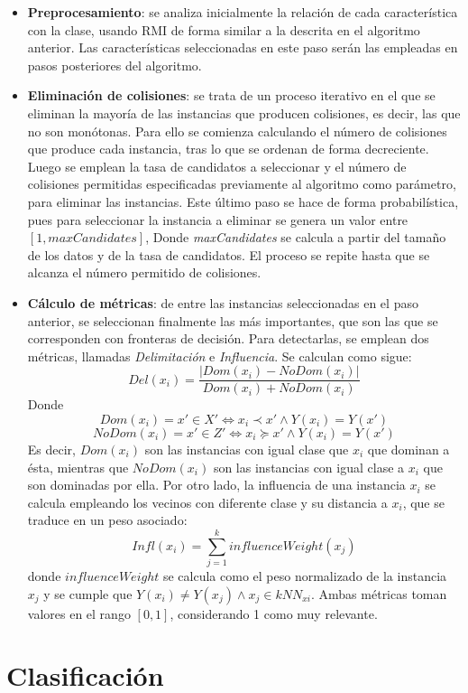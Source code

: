 \begin{itemize}
	\item \textbf{Preprocesamiento}: se analiza inicialmente la relación de cada característica con la clase, usando RMI de forma similar a la descrita en el algoritmo anterior. Las características seleccionadas en este paso serán las empleadas en pasos posteriores del algoritmo.
	\item \textbf{Eliminación de colisiones}: se trata de un proceso iterativo en el que se eliminan la mayoría de las instancias que producen colisiones, es decir, las que no son monótonas. Para ello se comienza calculando el número de colisiones que produce cada instancia, tras lo que se ordenan de forma decreciente. Luego se emplean la tasa de candidatos a seleccionar y el número de colisiones permitidas especificadas previamente al algoritmo como parámetro, para eliminar las instancias. Este último paso se hace de forma probabilística, pues para seleccionar la instancia a eliminar se genera un valor entre $\left[1,maxCandidates \right]$, Donde \textit{maxCandidates} se calcula a partir del tamaño de los datos y de la tasa de candidatos. El proceso se repite hasta que se alcanza el número permitido de colisiones.
	\item \textbf{Cálculo de métricas}: de entre las instancias seleccionadas en el paso anterior, se seleccionan finalmente las más importantes, que son las que se corresponden con fronteras de decisión. Para detectarlas, se emplean dos métricas, llamadas \textit{Delimitación} e \textit{Influencia}. Se calculan como sigue:
	$$Del(x_i)=\frac{|Dom(x_i)-NoDom(x_i)|}{Dom(x_i)+NoDom(x_i)}$$
	Donde $$Dom(x_i)=x' \in X' \iff x_i \prec x' \land Y(x_i)=Y(x')$$
	$$NoDom(x_i)=x' \in Z' \iff x_i \succeq x' \land Y(x_i)=Y(x')$$
	Es decir, $Dom(x_i)$ son las instancias con igual clase que $x_i$ que dominan a ésta, mientras que $NoDom(x_i)$ son las instancias con igual clase a $x_i$ que son dominadas por ella. \newline
	Por otro lado, la influencia de una instancia $x_i$ se calcula empleando los vecinos con diferente clase y su distancia a $x_i$, que se traduce en un peso asociado: 
	$$Infl(x_i)=\sum_{j=1}^{k} influenceWeight(x_j)$$
	donde $influenceWeight$ se calcula como el peso normalizado de la instancia $x_j$ y se cumple que $Y(x_i) \neq Y(x_j) \land x_j \in kNN_{xi}$. \newline
	Ambas métricas toman valores en el rango $\left[0,1\right]$, considerando 1 como muy relevante. 
\end{itemize}
\section{Clasificación}
